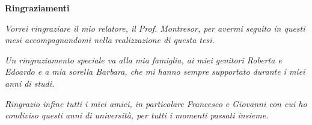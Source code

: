 \thispagestyle{empty}

\begin{center}
  {\bf \Huge Ringraziamenti}
\end{center}

\vspace{4cm}


\emph{
  Vorrei ringraziare il mio relatore, il Prof. Montresor, per avermi seguito in questi 
  mesi accompagnandomi nella realizzazione di questa tesi. 
}

\emph{
  Un ringraziamento speciale va alla mia famiglia, ai miei genitori Roberta e Edoardo
  e a mia sorella Barbara, che mi hanno sempre supportato durante i miei anni di studi.
}

\emph{
  Ringrazio infine tutti i miei amici, in particolare Francesco e Giovanni con
  cui ho condiviso questi anni di università, per tutti i momenti passati
  insieme.
}
